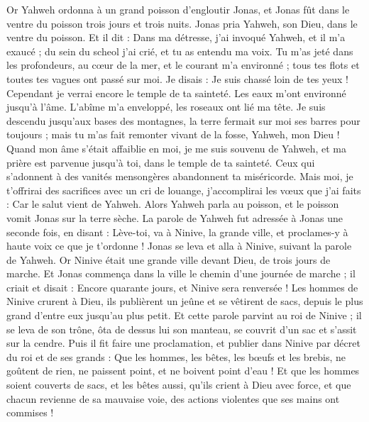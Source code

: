 \begin{multicols}{2}
\VerseOne{}Or Yahweh ordonna à un grand poisson d'engloutir Jonas, et Jonas fût dans le ventre du poisson trois jours et trois nuits.
Jonas pria Yahweh, son Dieu, dans le ventre du poisson.
Et il dit : Dans ma détresse, j'ai invoqué Yahweh, et il m'a exaucé ; du sein du scheol j'ai crié, et tu as entendu ma voix.
Tu m'as jeté dans les profondeurs, au cœur de la mer, et le courant m'a environné ; tous tes flots et toutes tes vagues ont passé sur moi.
Je disais : Je suis chassé loin de tes yeux ! Cependant je verrai encore le temple de ta sainteté.
Les eaux m'ont environné jusqu'à l'âme. L'abîme m'a enveloppé, les roseaux ont lié ma tête.
Je suis descendu jusqu'aux bases des montagnes, la terre fermait sur moi ses barres pour toujours ; mais tu m'as fait remonter vivant de la fosse, Yahweh, mon Dieu !
Quand mon âme s'était affaiblie en moi, je me suis souvenu de Yahweh, et ma prière est parvenue jusqu'à toi, dans le temple de ta sainteté.
Ceux qui s'adonnent à des vanités mensongères abandonnent ta miséricorde.
Mais moi, je t'offrirai des sacrifices avec un cri de louange, j'accomplirai les vœux que j'ai faits : Car le salut vient de Yahweh.
Alors Yahweh parla au poisson, et le poisson vomit Jonas sur la terre sèche.
\VerseOne{}La parole de Yahweh fut adressée à Jonas une seconde fois, en disant :
Lève-toi, va à Ninive, la grande ville, et proclames-y à haute voix ce que je t'ordonne !
Jonas se leva et alla à Ninive, suivant la parole de Yahweh. Or Ninive était une grande ville devant Dieu, de trois jours de marche.
Et Jonas commença dans la ville le chemin d'une journée de marche ; il criait et disait : Encore quarante jours, et Ninive sera renversée !
Les hommes de Ninive crurent à Dieu, ils publièrent un jeûne et se vêtirent de sacs, depuis le plus grand d'entre eux jusqu'au plus petit.
Et cette parole parvint au roi de Ninive ; il se leva de son trône, ôta de dessus lui son manteau, se couvrit d'un sac et s'assit sur la cendre.
Puis il fit faire une proclamation, et publier dans Ninive par décret du roi et de ses grands : Que les hommes, les bêtes, les bœufs et les brebis, ne goûtent de rien, ne paissent point, et ne boivent point d'eau !
Et que les hommes soient couverts de sacs, et les bêtes aussi, qu'ils crient à Dieu avec force, et que chacun revienne de sa mauvaise voie, des actions violentes que ses mains ont commises !

\end{multicols}

